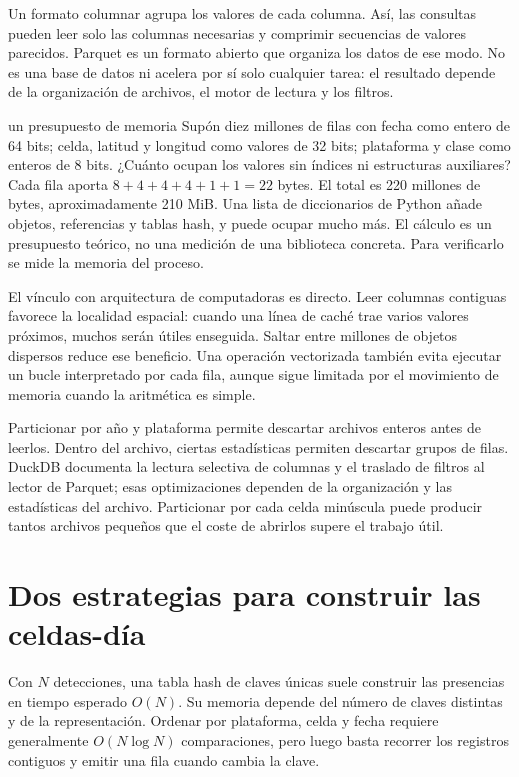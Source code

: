 Un formato columnar agrupa los valores de cada columna. Así, las consultas pueden
leer solo las columnas necesarias y comprimir secuencias de valores parecidos. Parquet
es un formato abierto que organiza los datos de ese modo. No es una
base de datos ni acelera por sí solo cualquier tarea: el resultado depende de la
organización de archivos, el motor de lectura y los filtros.

\begin{ejemplo}{un presupuesto de memoria}
Supón diez millones de filas con fecha como entero de 64 bits; celda, latitud y longitud
como valores de 32 bits; plataforma y clase como enteros de 8 bits. ¿Cuánto ocupan los
valores sin índices ni estructuras auxiliares?
\solucion Cada fila aporta $8+4+4+4+1+1=22$ bytes. El total es 220 millones de bytes,
aproximadamente 210 MiB. Una lista de diccionarios de Python añade objetos, referencias
y tablas hash, y puede ocupar mucho más. El cálculo es un presupuesto teórico, no una
medición de una biblioteca concreta. Para verificarlo se mide la memoria del proceso.
\end{ejemplo}

El vínculo con arquitectura de computadoras es directo. Leer columnas contiguas favorece
la localidad espacial: cuando una línea de caché trae varios valores próximos, muchos
serán útiles enseguida. Saltar entre millones de objetos dispersos reduce ese beneficio.
Una operación vectorizada también evita ejecutar un bucle interpretado por cada fila,
aunque sigue limitada por el movimiento de memoria cuando la aritmética es simple.

Particionar por año y plataforma permite descartar archivos enteros antes de leerlos.
Dentro del archivo, ciertas estadísticas permiten descartar grupos de filas. DuckDB
documenta la lectura selectiva de columnas y el traslado de filtros al lector de
Parquet; esas optimizaciones dependen de la organización y las estadísticas del archivo.
 Particionar por cada celda minúscula puede producir tantos archivos
pequeños que el coste de abrirlos supere el trabajo útil.

\FloatBarrier
\section{Dos estrategias para construir las celdas-día}

Con $N$ detecciones, una tabla hash de claves únicas suele construir las presencias
en tiempo esperado $O(N)$. Su memoria depende del número de claves distintas y de la
representación. Ordenar por plataforma, celda y fecha requiere generalmente
$O(N\log N)$ comparaciones, pero luego basta recorrer los registros contiguos y
emitir una fila cuando cambia la clave.

